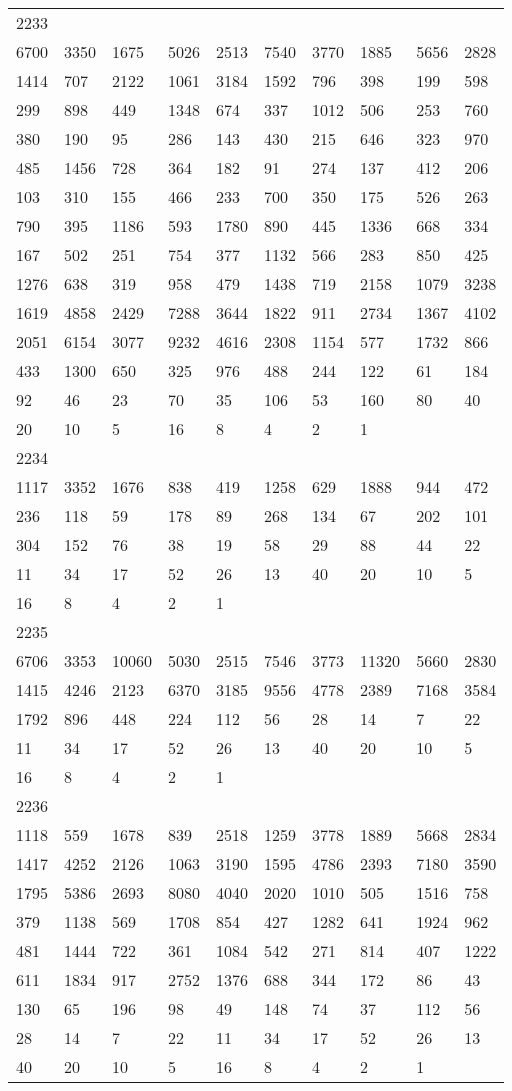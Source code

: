 \begin{longtable}{*{10}{l}}
2233&&&&&&&&&\\
6700& 3350& 1675& 5026& 2513& 7540& 3770& 1885& 5656& 2828\\
1414& 707& 2122& 1061& 3184& 1592& 796& 398& 199& 598\\
299& 898& 449& 1348& 674& 337& 1012& 506& 253& 760\\
380& 190& 95& 286& 143& 430& 215& 646& 323& 970\\
485& 1456& 728& 364& 182& 91& 274& 137& 412& 206\\
103& 310& 155& 466& 233& 700& 350& 175& 526& 263\\
790& 395& 1186& 593& 1780& 890& 445& 1336& 668& 334\\
167& 502& 251& 754& 377& 1132& 566& 283& 850& 425\\
1276& 638& 319& 958& 479& 1438& 719& 2158& 1079& 3238\\
1619& 4858& 2429& 7288& 3644& 1822& 911& 2734& 1367& 4102\\
2051& 6154& 3077& 9232& 4616& 2308& 1154& 577& 1732& 866\\
433& 1300& 650& 325& 976& 488& 244& 122& 61& 184\\
92& 46& 23& 70& 35& 106& 53& 160& 80& 40\\
20& 10& 5& 16& 8& 4& 2& 1& \\

2234&&&&&&&&&\\
1117& 3352& 1676& 838& 419& 1258& 629& 1888& 944& 472\\
236& 118& 59& 178& 89& 268& 134& 67& 202& 101\\
304& 152& 76& 38& 19& 58& 29& 88& 44& 22\\
11& 34& 17& 52& 26& 13& 40& 20& 10& 5\\
16& 8& 4& 2& 1& \\

2235&&&&&&&&&\\
6706& 3353& 10060& 5030& 2515& 7546& 3773& 11320& 5660& 2830\\
1415& 4246& 2123& 6370& 3185& 9556& 4778& 2389& 7168& 3584\\
1792& 896& 448& 224& 112& 56& 28& 14& 7& 22\\
11& 34& 17& 52& 26& 13& 40& 20& 10& 5\\
16& 8& 4& 2& 1& \\

2236&&&&&&&&&\\
1118& 559& 1678& 839& 2518& 1259& 3778& 1889& 5668& 2834\\
1417& 4252& 2126& 1063& 3190& 1595& 4786& 2393& 7180& 3590\\
1795& 5386& 2693& 8080& 4040& 2020& 1010& 505& 1516& 758\\
379& 1138& 569& 1708& 854& 427& 1282& 641& 1924& 962\\
481& 1444& 722& 361& 1084& 542& 271& 814& 407& 1222\\
611& 1834& 917& 2752& 1376& 688& 344& 172& 86& 43\\
130& 65& 196& 98& 49& 148& 74& 37& 112& 56\\
28& 14& 7& 22& 11& 34& 17& 52& 26& 13\\
40& 20& 10& 5& 16& 8& 4& 2& 1& \\


\end{longtable}
